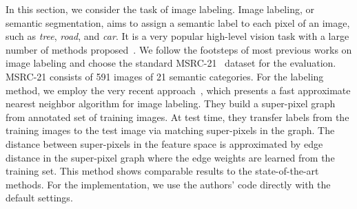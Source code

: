\documentclass[10pt,twocolumn,letterpaper]{article}
\begin{document}

In this section, we consider the task of image labeling. Image labeling, or semantic segmentation, aims to assign a semantic label to each pixel of an image, such as \emph{tree}, \emph{road}, and \emph{car}. It is a very popular high-level vision task with a large number of methods proposed~\cite{texton-forests, Gould:decomposing:ICCV09, dai:eccv12a, superpixel:eccv14}.  We follow the footsteps of most previous works on image labeling and choose the standard MSRC-21~\cite{Shotton:2006:ECCV} dataset for the evaluation. MSRC-21 consists of 591 images of 21 semantic categories. For the labeling method, we employ the very recent approach~\cite{superpixel:eccv14}, which presents a fast approximate nearest neighbor algorithm for image labeling. They build a super-pixel graph from annotated set of training images. At test time, they transfer labels from the training images to the test image via matching super-pixels in the graph. The distance between super-pixels in the feature space is approximated by edge distance in the super-pixel graph where the edge weights are learned from the training set. This method shows comparable results to the state-of-the-art methods. For the implementation, we use the authors' code directly with the default settings. 
\end{document}
